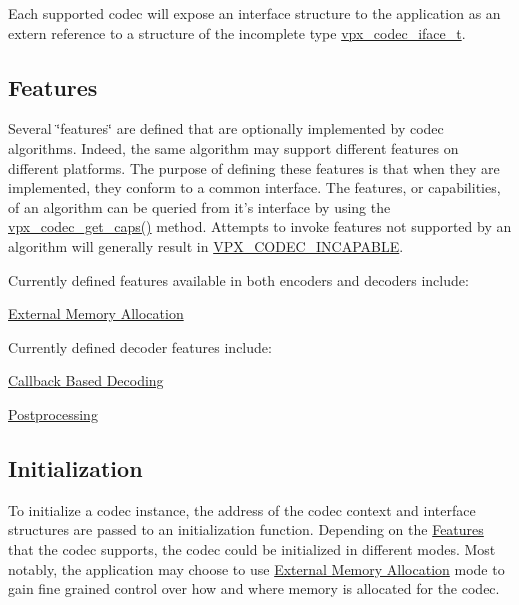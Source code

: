 \-Each supported codec will expose an interface structure to the application as an {\ttfamily extern} reference to a structure of the incomplete type \hyperlink{group__codec_gad654f3da60151f5dfef70aca00ef1e9e}{vpx\-\_\-codec\-\_\-iface\-\_\-t}.\hypertarget{usage_usage_features}{}\subsection{\-Features}\label{usage_usage_features}
\-Several \char`\"{}features\char`\"{} are defined that are optionally implemented by codec algorithms. \-Indeed, the same algorithm may support different features on different platforms. \-The purpose of defining these features is that when they are implemented, they conform to a common interface. \-The features, or capabilities, of an algorithm can be queried from it's interface by using the \hyperlink{group__codec_ga43adff58759093401235fb99247c82b8}{vpx\-\_\-codec\-\_\-get\-\_\-caps()} method. \-Attempts to invoke features not supported by an algorithm will generally result in \hyperlink{group__codec_ggada1084710837ad363b92f2379dd2b8d2a4470784ba5a3ef84dc0697d5489dd292}{\-V\-P\-X\-\_\-\-C\-O\-D\-E\-C\-\_\-\-I\-N\-C\-A\-P\-A\-B\-L\-E}.

\-Currently defined features available in both encoders and decoders include\-:
\begin{DoxyItemize}
\item \hyperlink{usage_xma}{\-External \-Memory \-Allocation}
\end{DoxyItemize}

\-Currently defined decoder features include\-:
\begin{DoxyItemize}
\item \hyperlink{usage_decode_usage_cb}{\-Callback \-Based \-Decoding}
\item \hyperlink{usage_decode_usage_postproc}{\-Postprocessing}
\end{DoxyItemize}\hypertarget{usage_usage_init}{}\subsection{\-Initialization}\label{usage_usage_init}
\-To initialize a codec instance, the address of the codec context and interface structures are passed to an initialization function. \-Depending on the \hyperlink{usage_usage_features}{\-Features} that the codec supports, the codec could be initialized in different modes. \-Most notably, the application may choose to use \hyperlink{usage_xma}{\-External \-Memory \-Allocation} mode to gain fine grained control over how and where memory is allocated for the codec.

